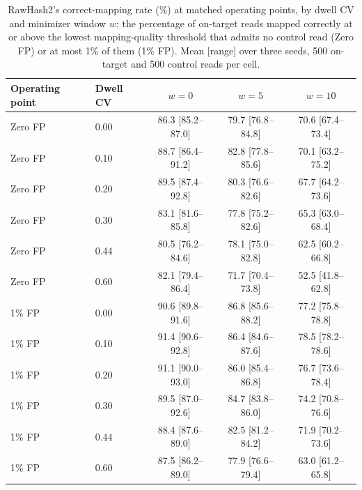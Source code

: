 \documentclass[11pt,a4paper]{article}
\begin{document}
\begin{table}[htbp]
\centering
\caption{RawHash2's correct-mapping rate (\%) at matched operating points, by dwell CV and minimizer
window $w$: the percentage of on-target reads mapped correctly at or above the lowest
mapping-quality threshold that admits no control read (Zero FP) or at most 1\% of them (1\% FP).
Mean [range] over three seeds, 500 on-target and 500 control reads per cell.}
\label{tab:s-matched}
\begin{tabular}{llccc}
\toprule
Operating point & Dwell CV & $w = 0$ & $w = 5$ & $w = 10$ \\
\midrule
Zero FP & 0.00 & 86.3 [85.2--87.0] & 79.7 [76.8--84.8] & 70.6 [67.4--73.4] \\
Zero FP & 0.10 & 88.7 [86.4--91.2] & 82.8 [77.8--85.6] & 70.1 [63.2--75.2] \\
Zero FP & 0.20 & 89.5 [87.4--92.8] & 80.3 [76.6--82.6] & 67.7 [64.2--73.6] \\
Zero FP & 0.30 & 83.1 [81.6--85.8] & 77.8 [75.2--82.6] & 65.3 [63.0--68.4] \\
Zero FP & 0.44 & 80.5 [76.2--84.6] & 78.1 [75.0--82.8] & 62.5 [60.2--66.8] \\
Zero FP & 0.60 & 82.1 [79.4--86.4] & 71.7 [70.4--73.8] & 52.5 [41.8--62.8] \\
\midrule
1\% FP & 0.00 & 90.6 [89.8--91.6] & 86.8 [85.6--88.2] & 77.2 [75.8--78.8] \\
1\% FP & 0.10 & 91.4 [90.6--92.8] & 86.4 [84.6--87.6] & 78.5 [78.2--78.6] \\
1\% FP & 0.20 & 91.1 [90.0--93.0] & 86.0 [85.4--86.8] & 76.7 [73.6--78.4] \\
1\% FP & 0.30 & 89.5 [87.0--92.6] & 84.7 [83.8--86.0] & 74.2 [70.8--76.6] \\
1\% FP & 0.44 & 88.4 [87.6--89.0] & 82.5 [81.2--84.2] & 71.9 [70.2--73.6] \\
1\% FP & 0.60 & 87.5 [86.2--89.0] & 77.9 [76.6--79.4] & 63.0 [61.2--65.8] \\
\bottomrule
\end{tabular}
\end{table}
\end{document}
